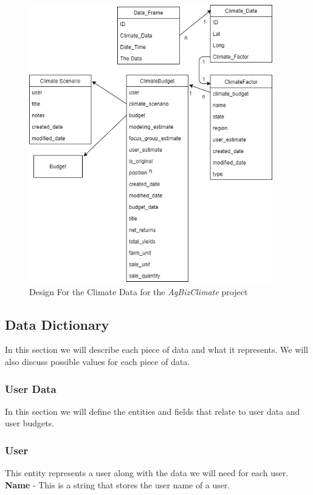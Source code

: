 \documentclass[onecolumn, draftclsnofoot,10pt, compsoc]{article}
\begin{document}
		\begin{figure}[htb]
			\begin{center}
				\includegraphics[width=300pt]{UMLDiagrams/ClimateData.jpg}
			\end{center}
			\caption{Design For the Climate Data for the \textit{AgBizClimate} project}
			\label{fig:CD1}
		\end{figure}
		
		
	\subsection{Data Dictionary}
		In this section we will describe each piece of data and what it represents. We will also discuss possible values for each piece of data.\\
		\subsubsection{User Data}
			In this section we will define the entities and fields that relate to user data and user budgets.\\
			\subsubsection{User}
				This entity represents a user along with the data we will need for each user.\\
				\textbf{Name} - This is a string that stores the user name of a user.\\
				
\end{document}
